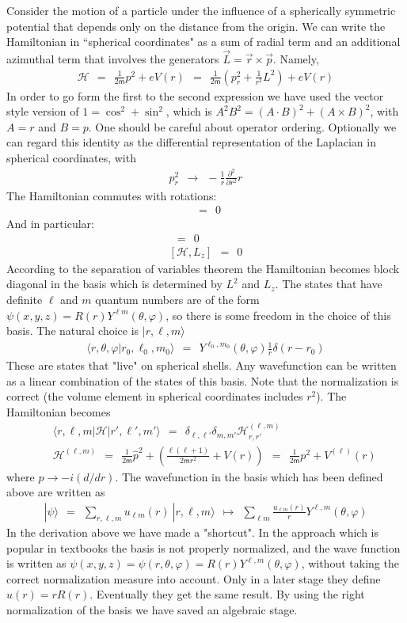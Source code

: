 \documentclass[onecolumn,fleqn, 11pt]{revtex4}
\newcommand{\mass}{\mathsf{m}}
\newcommand{\beq}{\begin{eqnarray}}
\newcommand{\eeq}{\end{eqnarray}}
\begin{document}
Consider the motion of a particle under 
the influence of a spherically symmetric 
potential that depends only on  
the distance from the origin. We can write 
the Hamiltonian in ``spherical coordinates" 
as a sum of radial term and an additional 
azimuthal term that involves the 
generators $\vec{L}= \vec{r} \times \vec{p}$. 
Namely,    
\beq
\mathcal{H} 
\ \ = \ \ \frac{1}{2\mass} p^2+eV(r) 
\ \ = \ \ \frac{1}{2\mass}\left(p_r^2 + \frac{1}{r^2} L^2\right) + eV(r) 
\eeq
In order to go form the first to the second expression 
we have used the vector style version of ${1=\cos^2+\sin^2}$, 
which is ${ A^2 B^2 = (A \cdot B)^2 +  (A \times B)^2}$, 
with $A=r$ and $B=p$. One should be careful about operator ordering. 
Optionally we can regard this identity as the differential 
representation of the Laplacian in spherical coordinates, with      
\beq
p_r^2 \ \ \rightarrow \ \ -\frac{1}{r}\frac{\partial^2}{\partial r^2} r 
\eeq
The Hamiltonian commutes with rotations:
\beq
[\mathcal{H},\hat{R}] \ \ = \ \ 0
\eeq
And in particular:
\beq
[\mathcal{H},L^2] \ \ = \ \ 0
\\ \nonumber
[\mathcal{H},L_z] \ \ = \ \ 0
\eeq
According to the separation of variables theorem 
the Hamiltonian becomes block diagonal in 
the basis which is determined by $L^2$ and $L_z$.   
The states that have definite $\ell$ 
and $m$ quantum numbers are of the 
form ${\psi(x,y,z) = R(r)Y^{\ell m}(\theta,\varphi)}$, 
so there is some freedom in the choice 
of this basis. The natural choice 
is ${ |r, \ell, m \rangle }$
\beq
\langle r, \theta, \varphi | r_0,\ell_0,m_0 \rangle 
\ \ = \ \ Y^{\ell_0,m_0}(\theta,\varphi) \frac{1}{r} \delta(r-r_0) 
\eeq
These are states that "live" on spherical shells. 
Any wavefunction can be written as a linear 
combination of the states of this basis. Note that 
the normalization is correct (the volume element 
in spherical coordinates includes ${r^2}$). 
The Hamiltonian becomes 
\beq
&& \langle r,\ell,m | \mathcal{H} | r', \ell', m' \rangle 
\ \ = \ \ \delta_{\ell,\ell' }\delta_{m,m'} \mathcal{H}^{(\ell,m)}_{r,r'}
\\ 
&& \mathcal{H}^{(\ell,m)}
\ \ = \ \ \frac{1}{2\mass}\hat{p}^2 
+ \left( \frac{\ell(\ell+1)}{2\mass r^2}+V(r)\right ) 
\ \ = \ \ \frac{1}{2\mass}p^2 + V^{(\ell)}(r) 
\eeq
where ${p \rightarrow -i(d/dr)}$.
The wavefunction in the basis which has been 
defined above are written as  
\beq
|\psi\rangle 
\ \ = \ \ 
\sum_{r,\ell,m} u_{\ell m}(r) \ | r, \ell, m \rangle
\ \ \longmapsto \ \ 
\sum_{\ell m} \frac{u_{\ell m}(r)}{r} Y^{\ell,m}(\theta,\varphi)
\eeq 
In the derivation above we have made a "shortcut". 
In the approach which is popular in textbooks the basis 
is not properly normalized, 
and the wave function is written as 
${\psi(x,y,z) = \psi(r,\theta,\varphi) = R(r) Y^{\ell,m}(\theta,\varphi)}$, 
without taking the correct normalization measure 
into account. Only in a later stage they 
define ${u(r) = rR(r)}$.  
Eventually they get the same result. 
By using the right normalization of the basis 
we have saved an algebraic stage. 
\end{document}
